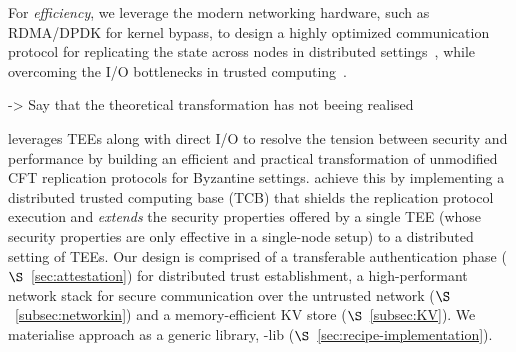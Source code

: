 For {\em efficiency}, we leverage the modern networking hardware, such as RDMA/DPDK for kernel bypass, to design a highly optimized communication protocol for replicating the state across nodes in distributed settings~\cite{rdma, dpdk, erpc}, while overcoming the I/O bottlenecks in trusted computing~\cite{rkt-io}.


-> Say that the theoretical transformation has not beeing realised


\projecttitle{} leverages TEEs along with direct I/O to resolve the tension between security and performance by building an efficient and practical transformation of unmodified CFT replication protocols for Byzantine settings. \projecttitle{} achieve this by implementing a distributed trusted computing base (TCB) that shields the replication protocol execution and {\em extends} the security properties offered by a single TEE (whose security properties are only effective in a single-node setup) to a distributed setting of TEEs. Our design is comprised of a transferable authentication phase ($\S$~\ref{sec:attestation}) for distributed trust establishment, a high-performant network stack for secure communication over the untrusted network ($\S$~\ref{subsec:networkin}) and a memory-efficient KV store ($\S$~\ref{subsec:KV}).  We materialise \projecttitle{} approach as a generic library, \projecttitle{}-lib ($\S$~\ref{sec:recipe-implementation}).





